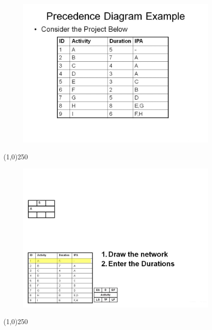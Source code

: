 \begin{frame}
\begin{figure}
	\centering
		\includegraphics[width = 10.0cm]{oldnotes/Slide126.jpg}
\end{figure}
\end{frame}
\begin{center}\line(1,0){250}\end{center}


\begin{frame}
\begin{figure}
	\centering
		\includegraphics[width = 10.0cm]{oldnotes/Slide127.jpg}
\end{figure}
\end{frame}
\begin{center}\line(1,0){250}\end{center}


